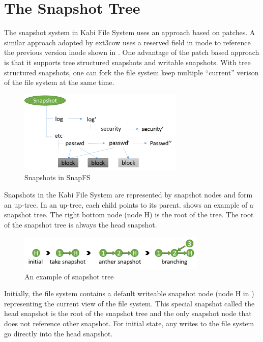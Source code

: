 \section{The Snapshot Tree}

    The snapshot system in Kabi File System uses an approach based on patches. A similar approach adopted by ext3cow uses a reserved field in inode to reference the previous version inode shown in . One advantage of the patch based approach is that it supports tree structured snapshots and writable snapshots. With tree structured snapshots, one can fork the file system keep multiple ``current'' verison of the file system at the same time.

\begin{figure}[t]
\centering
\includegraphics[width=0.7\textwidth]{Chapter-4/figs/fig24.png}
\caption{Snapshots in SnapFS}
\label{fig:snapfs_approach}
\end{figure}

    Snapshots in the Kabi File System are represented by snapshot nodes and form an up-tree. In an up-tree, each child points to its parent.  shows an example of a snapshot tree. The right bottom node (node H) is the root of the tree. The root of the snapshot tree is always the head snapshot.

\begin{figure}[t]
\centering
\includegraphics[width=0.8\textwidth]{Chapter-4/figs/fig13.png}
\caption{An example of snapshot tree}
\label{fig:snap_tree_example}
\end{figure}

    Initially, the file system contains a default writeable snapshot node (node H in ) representing the current view of the file system. This special snapshot called the head snapshot is the root of the snapshot tree and the only snapshot node that does not reference other snapshot. For initial state, any writes to the file system go directly into the head snapshot.
    
